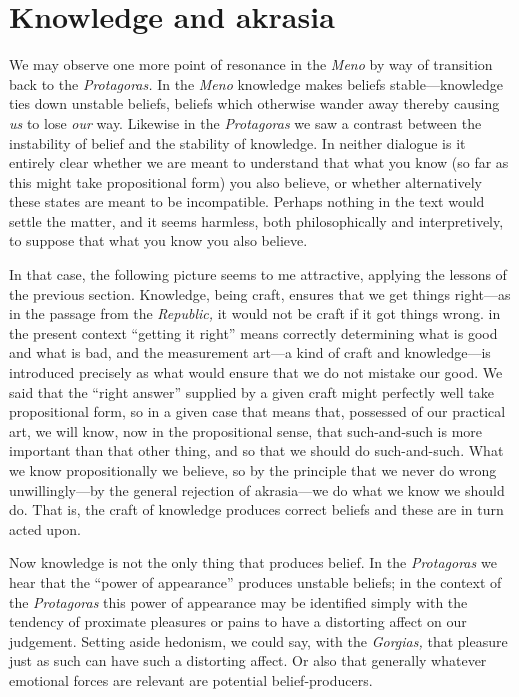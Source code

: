 \documentclass[11pt]{amsart}
\begin{document}
\section{Knowledge and akrasia}


We may observe one more point of resonance in the \emph{Meno} by way
of transition back to the \emph{Protagoras.} In the \emph{Meno}
knowledge makes beliefs stable---knowledge ties down unstable beliefs,
beliefs which otherwise wander away thereby causing \emph{us} to lose
\emph{our} way. Likewise in the \emph{Protagoras} we saw a contrast
between the instability of belief and the stability of knowledge. In
neither dialogue is it entirely clear whether we are meant to
understand that what you know (so far as this might take propositional
form) you also believe, or whether alternatively these states are
meant to be incompatible. Perhaps nothing in the text would settle the
matter, and it seems harmless, both philosophically and
interpretively, to suppose that what you know you also believe.


In that case, the following picture seems to me attractive, applying
the lessons of the previous section. Knowledge, being craft, ensures
that we get things right---as in the passage from the \emph{Republic,}
it would not be craft if it got things wrong. in the present context
``getting it right'' means correctly determining what is good and what
is bad, and the measurement art---a kind of craft and knowledge---is
introduced precisely as what would ensure that we do not mistake our
good. We said that the ``right answer'' supplied by a given craft
might perfectly well take propositional form, so in a given case that
means that, possessed of our practical art, we will know, now in the
propositional sense, that such-and-such is more important than that
other thing, and so that we should do such-and-such. What we know
propositionally we believe, so by the principle that we never do wrong
unwillingly---by the general rejection of akrasia---we do what we know
we should do. That is, the craft of knowledge produces correct beliefs
and these are in turn acted upon.


Now knowledge is not the only thing that produces belief. In the
\emph{Protagoras} we hear that the ``power of appearance'' produces
unstable beliefs; in the context of the \emph{Protagoras} this power
of appearance may be identified simply with the tendency of proximate
pleasures or pains to have a distorting affect on our judgement.
Setting aside hedonism, we could say, with the \emph{Gorgias,} that
pleasure just as such can have such a distorting affect. Or also that
generally whatever emotional forces are relevant are potential
belief-producers.
\end{document}
